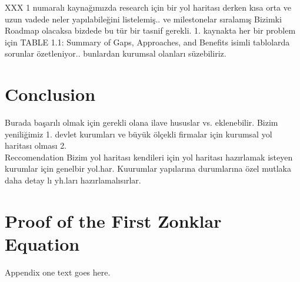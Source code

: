\documentclass[journal]{IEEEtran}
\begin{document}
XXX 1 numaralı kaynağımızda research için bir yol haritası derken kısa orta ve uzun vadede neler yapılabileğini listelemiş.. ve milestonelar sıralamış Bizimki Roadmap olacaksa bizdede bu tür bir tasnif gerekli.
1. kaynakta her bir problem için TABLE 1.1: Summary of Gaps, Approaches, and Benefits isimli tablolarda sorunlar özetleniyor.. bunlardan kurumsal olanları süzebiliriz.\cite{maughan2009roadmap}

\section{Conclusion}
Burada başarılı olmak için gerekli olana ilave hususlar vs.
eklenebilir.
 Bizim yeniliğimiz
1. devlet kurumları ve büyük ölçekli firmalar için kurumsal yol haritası olması
2.
\\
Reccomendation
Bizim yol haritası kendileri için yol haritası hazırlamak isteyen kurumlar için genelbir yol.har. Kuurumlar yapılarına durumlarına özel mutlaka daha detay lı yh.ları hazırlamalısırlar.





%


\appendices
\section{Proof of the First Zonklar Equation}
Appendix one text goes here.
\end{document}
